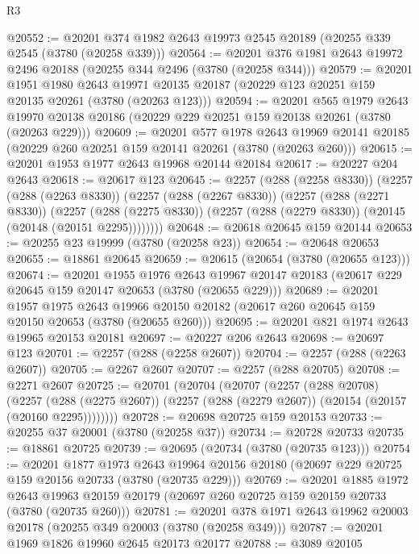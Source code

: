 \begin{lexlean}{R3}
\begin{coremodule}
@20552 := @20201 @374 @1982 @2643 @19973 @2545 @20189 (@20255 @339 @2545 (@3780 (@20258 @339)))
@20564 := @20201 @376 @1981 @2643 @19972 @2496 @20188 (@20255 @344 @2496 (@3780 (@20258 @344)))
@20579 := @20201
    @1951
    @1980
    @2643
    @19971
    @20135
    @20187
    (@20229 @123 @20251 @159 @20135 @20261 (@3780 (@20263 @123)))
@20594 := @20201
    @565
    @1979
    @2643
    @19970
    @20138
    @20186
    (@20229 @229 @20251 @159 @20138 @20261 (@3780 (@20263 @229)))
@20609 := @20201
    @577
    @1978
    @2643
    @19969
    @20141
    @20185
    (@20229 @260 @20251 @159 @20141 @20261 (@3780 (@20263 @260)))
@20615 := @20201 @1953 @1977 @2643 @19968 @20144 @20184
@20617 := @20227 @204 @2643
@20618 := @20617 @123
@20645 := @2257
    (@288 (@2258 @8330))
    (@2257
      (@288 (@2263 @8330))
      (@2257
        (@288 (@2267 @8330))
        (@2257
          (@288 (@2271 @8330))
          (@2257
            (@288 (@2275 @8330))
            (@2257 (@288 (@2279 @8330)) (@20145 (@20148 (@20151 @2295))))))))
@20648 := @20618 @20645 @159 @20144
@20653 := @20255 @23 @19999 (@3780 (@20258 @23))
@20654 := @20648 @20653
@20655 := @18861 @20645
@20659 := @20615 (@20654 (@3780 (@20655 @123)))
@20674 := @20201
    @1955
    @1976
    @2643
    @19967
    @20147
    @20183
    (@20617 @229 @20645 @159 @20147 @20653 (@3780 (@20655 @229)))
@20689 := @20201
    @1957
    @1975
    @2643
    @19966
    @20150
    @20182
    (@20617 @260 @20645 @159 @20150 @20653 (@3780 (@20655 @260)))
@20695 := @20201 @821 @1974 @2643 @19965 @20153 @20181
@20697 := @20227 @206 @2643
@20698 := @20697 @123
@20701 := @2257 (@288 (@2258 @2607))
@20704 := @2257 (@288 (@2263 @2607))
@20705 := @2267 @2607
@20707 := @2257 (@288 @20705)
@20708 := @2271 @2607
@20725 := @20701
    (@20704
      (@20707
        (@2257
          (@288 @20708)
          (@2257
            (@288 (@2275 @2607))
            (@2257 (@288 (@2279 @2607)) (@20154 (@20157 (@20160 @2295))))))))
@20728 := @20698 @20725 @159 @20153
@20733 := @20255 @37 @20001 (@3780 (@20258 @37))
@20734 := @20728 @20733
@20735 := @18861 @20725
@20739 := @20695 (@20734 (@3780 (@20735 @123)))
@20754 := @20201
    @1877
    @1973
    @2643
    @19964
    @20156
    @20180
    (@20697 @229 @20725 @159 @20156 @20733 (@3780 (@20735 @229)))
@20769 := @20201
    @1885
    @1972
    @2643
    @19963
    @20159
    @20179
    (@20697 @260 @20725 @159 @20159 @20733 (@3780 (@20735 @260)))
@20781 := @20201 @378 @1971 @2643 @19962 @20003 @20178 (@20255 @349 @20003 (@3780 (@20258 @349)))
@20787 := @20201 @1969 @1826 @19960 @2645 @20173 @20177
@20788 := @3089 @20105

\end{coremodule}
\end{lexlean}
